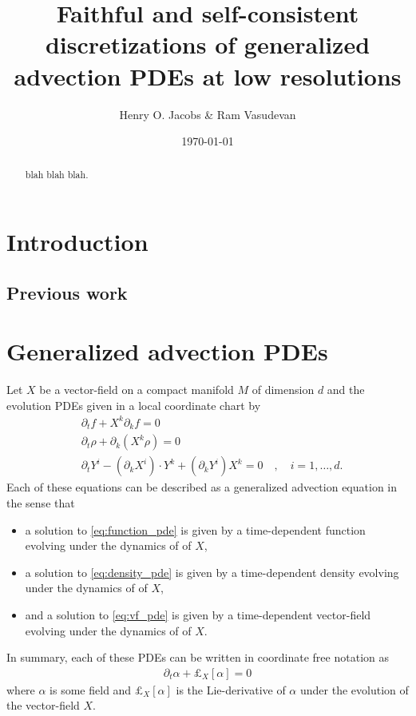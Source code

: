 \documentclass[12pt]{amsart}
\title{Faithful and self-consistent discretizations of generalized advection PDEs at low resolutions}
\author{Henry O. Jacobs \& Ram Vasudevan}
\date{\today}
\begin{document}
\maketitle

\begin{abstract}
  blah blah blah.
\end{abstract}

\section{Introduction}

\subsection{Previous work}

\section{Generalized advection PDEs}
\label{sec:PDEs}
Let $X$ be a vector-field on a compact manifold $M$ of dimension $d$
and the evolution PDEs given in a local coordinate chart by
\begin{align}
	&\partial_t f + X^k \partial_k f= 0 \label{eq:function_pde} \\
	&\partial_t \rho + \partial_k( X^k \rho) = 0  \label{eq:density_pde} \\
	&\partial_t Y^i - (\partial_k X^i) \cdot Y^k + (\partial_k Y^i) X^k  = 0 \quad , \quad i = 1,\dots,d \label{eq:vf_pde}.
\end{align}
Each of these equations can be described as a generalized advection equation in the sense that
\begin{itemize}
	\item a solution to \eqref{eq:function_pde} is given by a time-dependent function evolving under the dynamics of of $X$,
	\item a solution to \eqref{eq:density_pde} is given by a time-dependent density evolving under the dynamics of of $X$,
	\item and a solution to \eqref{eq:vf_pde} is given by a time-dependent vector-field evolving under the dynamics of of $X$.
\end{itemize}
In summary, each of these PDEs can be written in coordinate free notation as
\begin{align}
	\partial_t \alpha + \pounds_{X}[\alpha] = 0 \label{eq:advection_pde}
\end{align}
where $\alpha$ is some field and $\pounds_X[\alpha]$ is the Lie-derivative of $\alpha$ under the evolution of the vector-field $X$.
\end{document}

